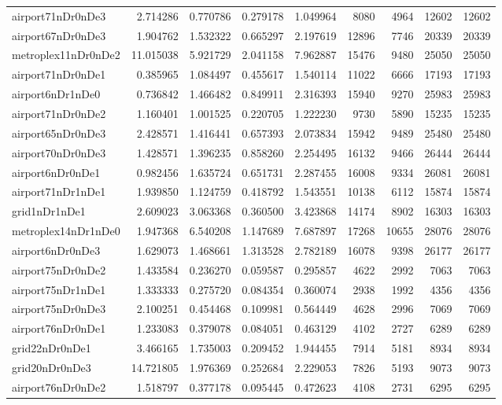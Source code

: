 \begin{longtable}{|l|r|r|r|r|r|r|r|r|}
airport71nDr0nDe3 & 2.714286 & 0.770786 & 0.279178 & 1.049964 & 8080 & 4964 & 12602 & 12602 \\
airport67nDr0nDe3 & 1.904762 & 1.532322 & 0.665297 & 2.197619 & 12896 & 7746 & 20339 & 20339 \\
metroplex11nDr0nDe2 & 11.015038 & 5.921729 & 2.041158 & 7.962887 & 15476 & 9480 & 25050 & 25050 \\
airport71nDr0nDe1 & 0.385965 & 1.084497 & 0.455617 & 1.540114 & 11022 & 6666 & 17193 & 17193 \\
airport6nDr1nDe0 & 0.736842 & 1.466482 & 0.849911 & 2.316393 & 15940 & 9270 & 25983 & 25983 \\
airport71nDr0nDe2 & 1.160401 & 1.001525 & 0.220705 & 1.222230 & 9730 & 5890 & 15235 & 15235 \\
airport65nDr0nDe3 & 2.428571 & 1.416441 & 0.657393 & 2.073834 & 15942 & 9489 & 25480 & 25480 \\
airport70nDr0nDe3 & 1.428571 & 1.396235 & 0.858260 & 2.254495 & 16132 & 9466 & 26444 & 26444 \\
airport6nDr0nDe1 & 0.982456 & 1.635724 & 0.651731 & 2.287455 & 16008 & 9334 & 26081 & 26081 \\
airport71nDr1nDe1 & 1.939850 & 1.124759 & 0.418792 & 1.543551 & 10138 & 6112 & 15874 & 15874 \\
grid1nDr1nDe1 & 2.609023 & 3.063368 & 0.360500 & 3.423868 & 14174 & 8902 & 16303 & 16303 \\
metroplex14nDr1nDe0 & 1.947368 & 6.540208 & 1.147689 & 7.687897 & 17268 & 10655 & 28076 & 28076 \\
airport6nDr0nDe3 & 1.629073 & 1.468661 & 1.313528 & 2.782189 & 16078 & 9398 & 26177 & 26177 \\
airport75nDr0nDe2 & 1.433584 & 0.236270 & 0.059587 & 0.295857 & 4622 & 2992 & 7063 & 7063 \\
airport75nDr1nDe1 & 1.333333 & 0.275720 & 0.084354 & 0.360074 & 2938 & 1992 & 4356 & 4356 \\
airport75nDr0nDe3 & 2.100251 & 0.454468 & 0.109981 & 0.564449 & 4628 & 2996 & 7069 & 7069 \\
airport76nDr0nDe1 & 1.233083 & 0.379078 & 0.084051 & 0.463129 & 4102 & 2727 & 6289 & 6289 \\
grid22nDr0nDe1 & 3.466165 & 1.735003 & 0.209452 & 1.944455 & 7914 & 5181 & 8934 & 8934 \\
grid20nDr0nDe3 & 14.721805 & 1.976369 & 0.252684 & 2.229053 & 7826 & 5193 & 9073 & 9073 \\
airport76nDr0nDe2 & 1.518797 & 0.377178 & 0.095445 & 0.472623 & 4108 & 2731 & 6295 & 6295 \\

\end{longtable}
